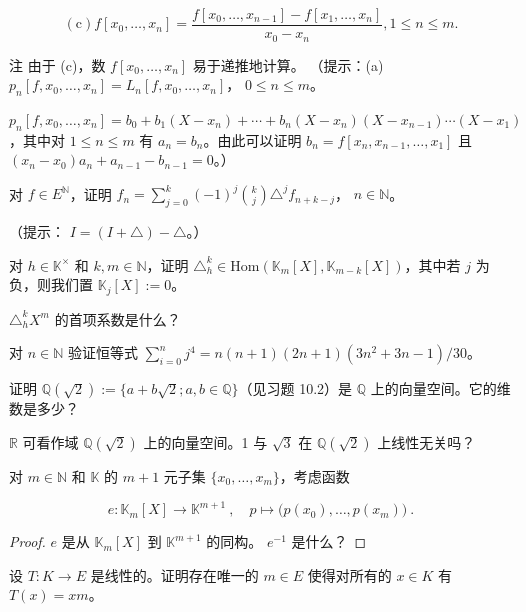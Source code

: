 \begin{exercises}
\begin{items}
\[
\mathrm{(c)}f[x_{0},\ldots,x_{n}]=\frac{f[x_{0},\ldots,x_{n-1}]-f[x_{1},\ldots,x_{n}]}{x_{0}-x_{n}},1\leq n\leq m.
\]

注 由于 (c)，数  $ f[x_{0}, \ldots, x_{n}] $ 易于递推地计算。
（提示：(a)  $ p_n[f, x_0, \ldots, x_n] = L_n[f, x_0, \ldots, x_n] $， $ 0 \leq n \leq m $。

\item

$p_n[f, x_0, \ldots, x_n] = b_0 + b_1 (X - x_n) + \cdots + b_n (X - x_n) (X - x_{n-1}) \cdots (X - x_1)$，其中对 $1 \leq n \leq m$ 有 $a_n = b_n$。由此可以证明 $b_n = f[x_n, x_{n-1}, \ldots, x_1]$ 且 $(x_n - x_0) a_n + a_{n-1} - b_{n-1} = 0$。）

\end{items}

\item

对  $ f \in E^{\mathbb{N}} $，证明  $ f_n = \sum_{j=0}^{k} (-1)^j \binom{k}{j} \triangle^j f_{n+k-j} $， $ n \in \mathbb{N} $。

（提示： $ I = (I + \triangle) - \triangle $。）

\item

对  $ h \in \mathbb{K}^\times $ 和  $ k, m \in \mathbb{N} $，证明  $ \triangle_h^k \in \mathrm{Hom}(\mathbb{K}_m[X], \mathbb{K}_{m-k}[X]) $，其中若  $ j $ 为负，则我们置  $ \mathbb{K}_j[X] := 0 $。

 $ \triangle_h^k X^m $ 的首项系数是什么？

\item

对  $ n \in \mathbb{N} $ 验证恒等式  $ \sum_{i=0}^{n} j^{4} = n (n+1)(2n+1)(3n^{2} + 3n-1)/30 $。

\item

证明  $ \mathbb{Q}(\sqrt{2}) := \{a + b\sqrt{2} ; a, b \in \mathbb{Q}\} $（见习题 10.2）是  $ \mathbb{Q} $ 上的向量空间。它的维数是多少？

\item

$ \mathbb{R} $ 可看作域  $ \mathbb{Q}(\sqrt{2}) $ 上的向量空间。1 与  $ \sqrt{3} $ 在  $ \mathbb{Q}(\sqrt{2}) $ 上线性无关吗？

\item

对  $ m \in \mathbb{N} $ 和  $ \mathbb{K} $ 的  $ m + 1 $ 元子集  $ \{x_0, \ldots, x_m\} $，考虑函数

\[
e\colon\mathbb{K}_{m}[X]\to\mathbb{K}^{m+1}~,\quad p\mapsto\bigl(p(x_{0}),\ldots,p(x_{m})\bigr)~.
\]
\end{exercises}

\begin{proof}

$ e $ 是从  $ \mathbb{K}_m[X] $ 到  $ \mathbb{K}^{m+1} $ 的同构。 $ e^{-1} $ 是什么？

\end{proof}

\begin{exercises}
\item[17.]

设 $T: K \to E$ 是线性的。证明存在唯一的 $m \in E$ 使得对所有的 $x \in K$ 有 $T(x) = xm$。

\end{exercises}
